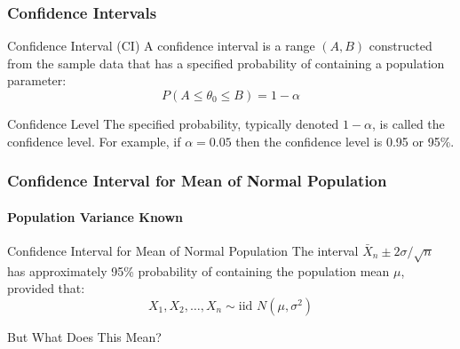 \documentclass[handout]{beamer}
\begin{document}

\begin{frame}
\frametitle{Confidence Intervals}

\begin{block}{Confidence Interval (CI)}
A confidence interval is a range $(A,B)$ constructed from the \alert{sample data} that has a specified probability of containing a \alert{population parameter}:
	$$P(A \leq \theta_0 \leq B) = 1-\alpha$$
\end{block} 

\pause

\begin{block}{Confidence Level}
The \alert{specified probability}, typically denoted $1-\alpha$, is called the confidence level. For example, if $\alpha = 0.05$ then the confidence level is 0.95 or 95\%.
\end{block}
\end{frame}

\begin{frame}
\frametitle{Confidence Interval for Mean of Normal Population}
\framesubtitle{Population Variance Known}


\begin{block}{Confidence Interval for Mean of Normal Population}
	The interval \alert{$\boxed{\bar{X}_n \pm 2 \sigma/\sqrt{n}}$} has approximately 95\% probability of containing the population mean $\mu$, provided that:
		$$\boxed{X_1, X_2, \hdots, X_n\sim \mbox{iid } N(\mu,\sigma^2)}$$
\end{block}

\pause

\begin{alertblock}{But What Does This Mean?}
\end{alertblock}

\end{frame}
\end{document}
